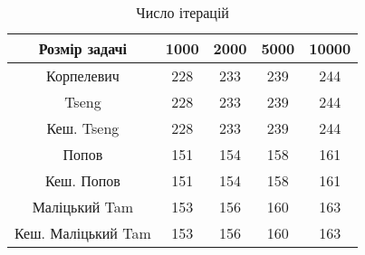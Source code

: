 \begin{table}[H]
	\centering
	\begin{tabular}{|c||c|c|c|c|}\hline
		Розмір задачі & 1000 & 2000 & 5000 & 10000 \\ \hline \hline
		Корпелевич & 228 & 233 & 239 & 244 \\ \hline
		Tseng & 228 & 233 & 239 & 244 \\ \hline
		Кеш. Tseng & 228 & 233 & 239 & 244 \\ \hline
		Попов & 151 & 154 & 158 & 161 \\ \hline
		Кеш. Попов & 151 & 154 & 158 & 161 \\ \hline
		Маліцький Tam & 153 & 156 & 160 & 163 \\ \hline
		Кеш. Маліцький Tam & 153 & 156 & 160 & 163 \\ \hline
	\end{tabular}
	\caption{Число ітерацій}
\end{table}
